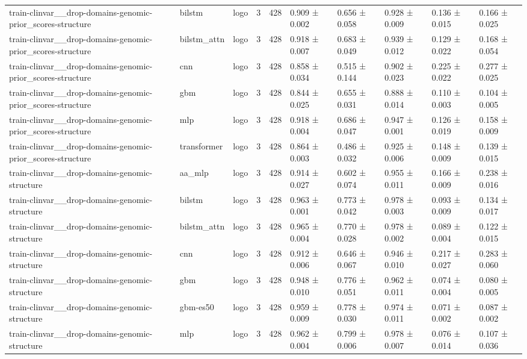\begin{table}[t]
\begin{tabular}{llllllllll}
train-clinvar\_\_drop-domains-genomic-prior\_scores-structure & bilstm & logo & 3 & 428 & 0.909 ± 0.002 & 0.656 ± 0.058 & 0.928 ± 0.009 & 0.136 ± 0.015 & 0.166 ± 0.025 \\
train-clinvar\_\_drop-domains-genomic-prior\_scores-structure & bilstm\_attn & logo & 3 & 428 & 0.918 ± 0.007 & 0.683 ± 0.049 & 0.939 ± 0.012 & 0.129 ± 0.022 & 0.168 ± 0.054 \\
train-clinvar\_\_drop-domains-genomic-prior\_scores-structure & cnn & logo & 3 & 428 & 0.858 ± 0.034 & 0.515 ± 0.144 & 0.902 ± 0.023 & 0.225 ± 0.022 & 0.277 ± 0.025 \\
train-clinvar\_\_drop-domains-genomic-prior\_scores-structure & gbm & logo & 3 & 428 & 0.844 ± 0.025 & 0.655 ± 0.031 & 0.888 ± 0.014 & 0.110 ± 0.003 & 0.104 ± 0.005 \\
train-clinvar\_\_drop-domains-genomic-prior\_scores-structure & mlp & logo & 3 & 428 & 0.918 ± 0.004 & 0.686 ± 0.047 & 0.947 ± 0.001 & 0.126 ± 0.019 & 0.158 ± 0.009 \\
train-clinvar\_\_drop-domains-genomic-prior\_scores-structure & transformer & logo & 3 & 428 & 0.864 ± 0.003 & 0.486 ± 0.032 & 0.925 ± 0.006 & 0.148 ± 0.009 & 0.139 ± 0.015 \\
train-clinvar\_\_drop-domains-genomic-structure & aa\_mlp & logo & 3 & 428 & 0.914 ± 0.027 & 0.602 ± 0.074 & 0.955 ± 0.011 & 0.166 ± 0.009 & 0.238 ± 0.016 \\
train-clinvar\_\_drop-domains-genomic-structure & bilstm & logo & 3 & 428 & 0.963 ± 0.001 & 0.773 ± 0.042 & 0.978 ± 0.003 & 0.093 ± 0.009 & 0.134 ± 0.017 \\
train-clinvar\_\_drop-domains-genomic-structure & bilstm\_attn & logo & 3 & 428 & 0.965 ± 0.004 & 0.770 ± 0.028 & 0.978 ± 0.002 & 0.089 ± 0.004 & 0.122 ± 0.015 \\
train-clinvar\_\_drop-domains-genomic-structure & cnn & logo & 3 & 428 & 0.912 ± 0.006 & 0.646 ± 0.067 & 0.946 ± 0.010 & 0.217 ± 0.027 & 0.283 ± 0.060 \\
train-clinvar\_\_drop-domains-genomic-structure & gbm & logo & 3 & 428 & 0.948 ± 0.010 & 0.776 ± 0.051 & 0.962 ± 0.011 & 0.074 ± 0.004 & 0.080 ± 0.005 \\
train-clinvar\_\_drop-domains-genomic-structure & gbm-es50 & logo & 3 & 428 & 0.959 ± 0.009 & 0.778 ± 0.030 & 0.974 ± 0.011 & 0.071 ± 0.002 & 0.087 ± 0.002 \\
train-clinvar\_\_drop-domains-genomic-structure & mlp & logo & 3 & 428 & 0.962 ± 0.004 & 0.799 ± 0.006 & 0.978 ± 0.007 & 0.076 ± 0.014 & 0.107 ± 0.036 \\

\end{tabular}
\end{table}
